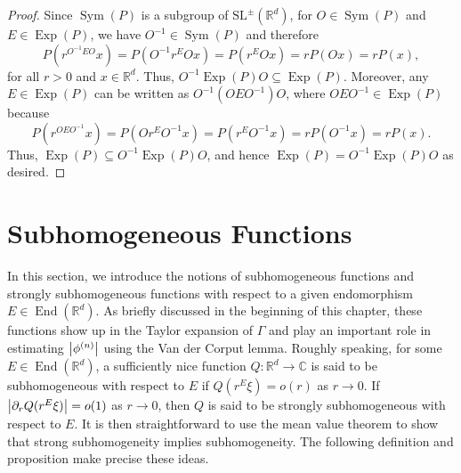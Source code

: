 \documentclass[11pt, letter]{book}
\newcommand\End{\operatorname{End}} %
\newcommand\Sym{\operatorname{Sym}}
\newcommand\Exp{\operatorname{Exp}}
\newcommand{\p}{\partial}
\begin{document}
\begin{proof}
Since $\Sym(P)$ is a subgroup of $\text{SL}^{\pm}(\mathbb{R}^d)$, for $O\in\Sym(P)$ and $E\in \Exp(P)$, we have $O^{-1}\in\Sym{(P)}$ and therefore
\begin{equation*}
    P(r^{O^{-1}E O} x) = P(O^{-1} r^E O x) = P(r^E O x) = rP(Ox) = rP(x),
\end{equation*}
for all  $r > 0$ and $x\in \mathbb{R}^d$. Thus, $O^{-1}\Exp(P) O \subseteq \Exp(P)$. Moreover, any $E\in \Exp(P)$ can be written as $O^{-1} (O E O^{-1}) O$, where $OEO^{-1}\in \Exp(P)$ because
\begin{equation*}
    P(r^{OE O^{-1}} x) = P(O r^E O^{-1} x) = P(r^E O^{-1} x) = rP(O^{-1}x) = rP(x).
\end{equation*}
Thus, $\Exp(P)\subseteq O^{-1}\Exp(P) O$, and hence $\Exp(P) = O^{-1} \Exp(P) O$ as desired. 
\end{proof}






\section{Subhomogeneous Functions}
In this section, we introduce the notions of subhomogeneous functions and strongly subhomogeneous functions with respect to a given endomorphism $E\in\End(\mathbb{R}^d)$. As briefly discussed in the beginning of this chapter, these functions show up in the Taylor expansion of $\Gamma$ and play an important role in estimating $\abs{\phi^{(n)}}$ using the Van der Corput lemma. Roughly speaking, for some $E\in \End{(\mathbb{R}^d)}$, a sufficiently nice function $Q: \mathbb{R}^d \to \mathbb{C}$ is said to be subhomogeneous with respect to $E$ if $Q(r^E \xi) = o(r)$ as $r\to 0$. If $\abs{\p_r Q(r^E \xi)} = o(1)$ as $r\to 0$, then $Q$ is said to be strongly subhomogeneous with respect to $E$. It is then straightforward to use the mean value theorem to show that strong subhomogeneity implies subhomogeneity. The following definition and proposition make precise these ideas. 
\end{document}
